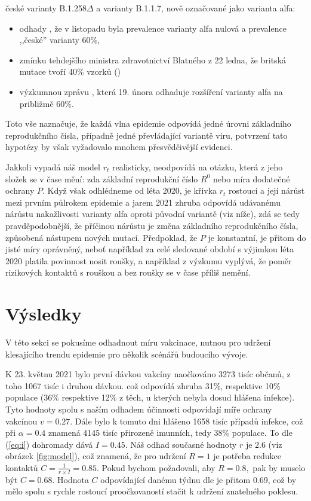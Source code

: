 české varianty B.1.258$\Delta$ a varianty B.1.1.7, nově označované jako varianta alfa:
\begin{itemize}
\item odhady \cite{brejova2021b}, že v listopadu byla
prevalence varianty alfa nulová a prevalence ,,české'' varianty 60\%, 
\item zmínku tehdejšího ministra zdravotnictví Blatného z 22 ledna, že britská mutace tvoří 40\% vzorků (\cite{blatnybrigit})
\item výzkumnou zprávu \cite{diana}, která 19. února odhaduje rozšíření varianty alfa
na približmě 60\%.
\end{itemize}
Toto vše naznačuje, že každá vlna epidemie odpovídá jedné úrovni základního reprodukčního čísla, případně jedné převládající variantě viru, potvrzení tato hypotézy by však vyžadovalo
mnohem přesvědčivější evidenci.

Jakkoli vypadá náš model $r_t$ realisticky, neodpovídá na otázku, která z jeho složek se v čase mění: zda základní reprodukční číslo $R^0$ nebo míra dodatečné ochrany $P$. Když však odhlédneme od léta 2020, je křivka $r_t$ rostoucí a její nárůst mezi prvním půlrokem epidemie a jarem 2021 zhruba odpovídá udávanému nárůstu nakažlivosti varianty alfa oproti původní variantě (viz níže), zdá se tedy pravděpodobnější, že příčinou nárůstu je změna základního reprodukčního čísla, způsobená nástupem nových mutací. Předpoklad, že $P$ je konstantní, je přitom do jisté míry 
oprávněný, neboť například za celé sledované období s výjimkou léta
2020 platila povinnost nosit roušky, a například z výzkumu \cite{paqcovid}
vyplývá, že poměr rizikových kontaktů s rouškou a bez roušky se v
čase příliš nemění. 

\section*{Výsledky}

V této sekci se pokusíme odhadnout míru vakcinace, nutnou pro udržení
klesajícího trendu epidemie pro několik scénářů budoucího vývoje. 

K 23. květnu 2021 bylo první dávkou vakcíny naočkováno 3273 tisíc
občanů, z toho 1067 tisíc i druhou dávkou. což odpovídá zhruba 31\%,
respektive 10\% populace (36\% respektive 12\% z těch, u kterých nebyla
dosud hlášena infekce). Tyto hodnoty spolu s naším odhadem účinnosti
odpovídají míře ochrany vakcínou $v=0.27$. Dále bylo k tomuto dni
hlášeno 1658 tisíc případů infekce, což při $\alpha=0.4$ znamená
4145 tisíc přirozeně imunních, tedy 38\% populace. To dle (\ref{eq:i})
dohromady dává $I=0.45$. Náš odhad současné hodnoty $r$ je $2.6$ (viz obrázek \ref{fig:model}), což znamená, že pro udržení $R=1$ je potřeba redukce kontaktů
$C=\frac{1}{r\times I}=0.85$. Pokud bychom požadovali, aby $R=0.8,$
pak by muselo být $C=0.68$. Hodnota $C$ odpovídající danému týdnu
dle \cite{paqcovid} je přitom 0.69, což by mělo spolu s
rychle rostoucí proočkovaností stačit k udržení znatelného poklesu.

